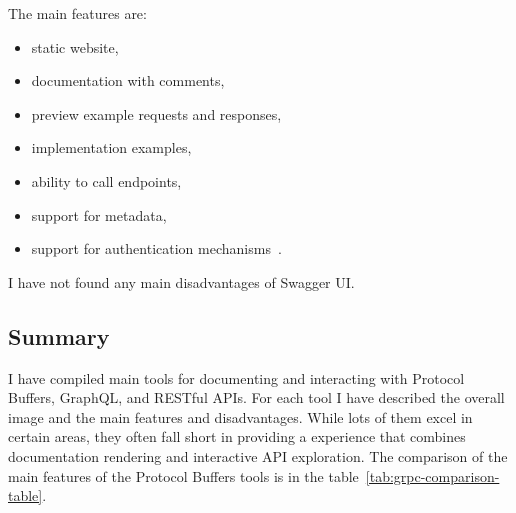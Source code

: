 The main features are:
\begin{itemize}
    \item static website,
    \item documentation with comments,
    \item preview example requests and responses,
    \item implementation examples,
    \item ability to call endpoints,
    \item support for metadata,
    \item support for authentication mechanisms~\cite{rest-swagger-ui}.
\end{itemize}

I have not found any main disadvantages of Swagger UI\@.

\subsection{Summary}
I have compiled main tools for documenting and interacting with Protocol Buffers, GraphQL, and RESTful APIs.
For each tool I have described the overall image and the main features and disadvantages.
While lots of them excel in certain areas, they often fall short in providing a experience that combines documentation rendering and interactive API exploration.
The comparison of the main features of the Protocol Buffers tools is in the table~\ref{tab:grpc-comparison-table}.

